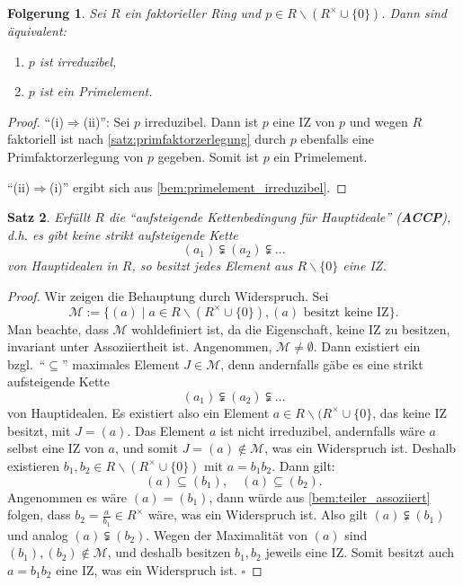 \documentclass[a4paper, twoside, 11pt, ngerman]{report}
\renewcommand{\setminus}{\smallsetminus}
\theoremstyle{definistyle}
\newtheorem{satz}{Satz}[section]
\newtheorem{folgerung}[satz]{Folgerung}
\theoremstyle{remark}
\newcommand{\defn}[1]{\textit{\bfseries #1}}
\begin{document}
\begin{folgerung}\label{folg:irreduzibel_prim_faktoriell}
Sei $R$ ein faktorieller Ring und $p \in R \setminus (R^\times \cup \{0\})$. Dann sind äquivalent:
\begin{enumerate}[label=(\roman*)]
    \item $p$ ist irreduzibel,
    \item $p$ ist ein Primelement.
\end{enumerate}
\end{folgerung}
\begin{proof}
"`(i)$\Rightarrow$(ii)"': Sei $p$ irreduzibel. Dann ist $p$ eine IZ von $p$ und wegen $R$ faktoriell ist nach \ref{satz:primfaktorzerlegung} durch $p$ ebenfalls eine Primfaktorzerlegung von $p$ gegeben. Somit ist $p$ ein Primelement.

"`(ii)$\Rightarrow$(i)"' ergibt sich aus \ref{bem:primelement_irreduzibel}.     
\end{proof}


\begin{satz}\label{satz:accp_iz_existenz}
Erfüllt $R$ die "`aufsteigende Kettenbedingung für Hauptideale"' (\defn{ACCP}), d.h. es gibt keine strikt aufsteigende Kette
\[
(a_1) \subsetneqq (a_2) \subsetneqq \dots
\]
von Hauptidealen in $R$, so besitzt jedes Element aus $R\setminus\{0\}$ eine IZ.
\end{satz}
\begin{proof}
Wir zeigen die Behauptung durch Widerspruch. Sei
\[
\mathcal{M} := \{(a) \mid a \in R \setminus (R^\times \cup \{0\}), (a) \text{ besitzt keine IZ}\}.
\]
Man beachte, dass $\mathcal M$ wohldefiniert ist, da die Eigenschaft, keine IZ zu besitzen,
invariant unter Assoziiertheit ist.
Angenommen, $\mathcal{M} \neq \emptyset$. Dann existiert ein bzgl.\ "`$\subseteq$"' maximales Element $J \in \mathcal{M}$, denn andernfalls gäbe es eine strikt aufsteigende Kette
\[
(a_1) \subsetneqq (a_2) \subsetneqq \dots
\]
von Hauptidealen.
Es existiert also ein Element $a \in R\setminus (R^\times \cup \{0\}$, das keine IZ besitzt, mit $J = (a)$. Das Element $a$ ist nicht irreduzibel, andernfalls wäre $a$ selbst eine IZ von $a$, und somit $J=(a) \notin \mathcal{M}$, was ein Widerspruch ist. Deshalb existieren $b_1, b_2 \in R \setminus (R^\times \cup \{0\})$ mit $a=b_1b_2$.
Dann gilt:
\[
(a) \subseteq (b_1), \quad (a) \subseteq (b_2).
\]
Angenommen es wäre $(a) = (b_1)$, dann würde aus \ref{bem:teiler_assoziiert} folgen, dass
$b_2 = \frac{a}{b_1}\in R^\times$ wäre, was ein Widerspruch ist.
Also gilt $(a) \subsetneqq (b_1)$ und analog $(a) \subsetneqq (b_2)$. 
Wegen der Maximalität von $(a)$ sind $(b_1), (b_2) \notin \mathcal{M}$, und deshalb besitzen $b_1, b_2$ jeweils eine IZ. Somit besitzt auch $a = b_1 b_2$ eine IZ, was ein Widerspruch ist. $\square$
\end{proof}
\end{document}
